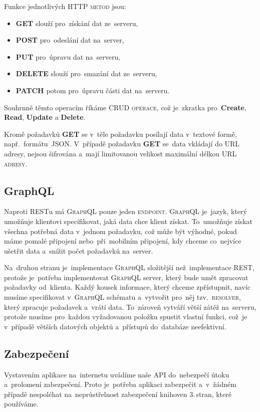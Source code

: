 \documentclass[14pt,a4paper]{article}
\begin{document}
        Funkce jednotlivých \textsc{HTTP metod} jsou:
        \begin{itemize}
            \item \textbf{GET} slouží pro~získání dat ze~serveru,
            \item \textbf{POST} pro~odeslání dat na~server,
            \item \textbf{PUT} pro~úpravu dat na~serveru,
            \item \textbf{DELETE} slouží pro~smazání dat ze~serveru,
            \item \textbf{PATCH} potom pro~úpravu části dat na~serveru.
        \end{itemize}

        Souhrnně těmto operacím říkáme \textsc{CRUD operace}, což je~zkratka pro~\textbf{Create}, \textbf{Read}, \textbf{Update} a \textbf{Delete}.

        Kromě požadavků \textbf{GET} se v~těle požadavku posílají data v~textové formě, např.~formátu~JSON. 
        V~případě požadavku \textbf{GET} se~data vkládají do URL adresy, nejsou šifrována a~mají limitovanou velikost maximální délkou \textsc{URL adresy}.

        \subsection{GraphQL}
        Naproti \textsc{REST}u má \textsc{GraphQL} pouze jeden \textsc{endpoint}. \textsc{GraphQL} je~jazyk, který umožňuje klientovi specifikovat, jaká data chce klient získat. To~umožňuje získat všechna potřebná data v~jednom požadavku, což může být výhodné, pokud máme pomalé připojení nebo~při~mobilním připojení, kdy chceme co~nejvíce ušetřit data a~snížit počet požadavků na~server.

        Na~druhou stranu je~implementace \textsc{GraphQL} složitější než~implementace \textsc{REST}, protože je~potřeba implementovat \textsc{GraphQL} server, který bude umět zpracovat požadavky od~klienta. Každý kousek informace, který chceme zpřístupnit, navíc musíme specifikovat v~\textsc{GraphQL} schématu a~vytvořit pro~něj tzv.~\textsc{resolver}, který zpracuje požadavek a~vrátí data. To~zároveň vytváří větší zátěž na~serveru, protože musíme pro~každou vyžadovanou položku spustit vlastní funkci, což~je v~případě větších datových objektů a~přístupů do~databáze neefektivní.

        \subsection{Zabezpečení}
        Vystavením aplikace na~internetu uvádíme naše \textsc{API} do~nebezpečí útoku a~prolomení zabezpečení. Proto je~potřeba aplikaci zabezpečit a~v~žádném případě nespoléhat na~neprůstřelnost zabezpečení knihoven 3.\,stran, které používáme.
        
\end{document}
